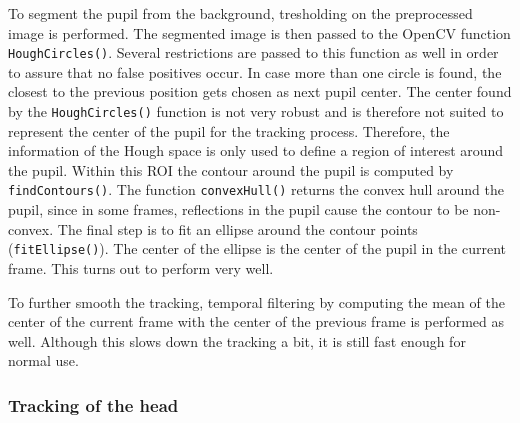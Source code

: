 To segment the pupil from the background, tresholding on the preprocessed image is performed. 
The segmented image is then passed to the OpenCV function \texttt{HoughCircles()}. 
Several restrictions are passed to this function as well in order to assure that no false positives occur. 
In case more than one circle is found, the closest to the previous position gets chosen as next pupil center.
The center found by the \texttt{HoughCircles()} function is not very robust and is therefore not suited to represent the center of the pupil for the tracking process.
Therefore, the information of the Hough space is only used to define a region of interest around the pupil. 
Within this ROI the contour around the pupil is computed by \texttt{findContours()}. 
The function \texttt{convexHull()} returns the convex hull around the pupil, since in some frames, reflections in the pupil cause the contour to be non-convex.
The final step is to fit an ellipse around the contour points (\texttt{fitEllipse()}).
The center of the ellipse is the center of the pupil in the current frame. 
This turns out to perform very well. 

To further smooth the tracking, temporal filtering by computing the mean of the center of the current frame with the center of the previous frame is performed as well. 
Although this slows down the tracking a bit, it is still fast enough for normal use.

\subsubsection{Tracking of the head}

